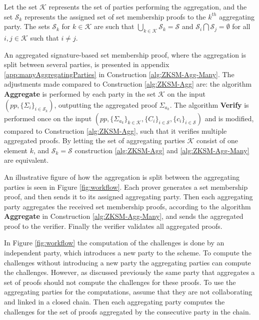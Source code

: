 Let the set $\mathcal{K}$ represents the set of parties performing the aggregation, and the set $\mathcal{S}_k$ represents the assigned set of set membership proofs to the $k^{th}$ aggregating party. The sets $\mathcal{S}_k$ for $k\in\mathcal{K}$ are such that $\bigcup_{k\in\mathcal{K}}\mathcal{S}_k = \mathcal{S}$ and $\mathcal{S}_i\bigcap \mathcal{S}_j= \emptyset$ for all $i,j\in\mathcal{K}$ such that $i\neq j$. 

An aggregated signature-based set membership proof, where the aggregation is split between several parties, is presented in appendix \ref{app:manyAggregatingParties} in Construction \ref{alg:ZKSM-Agg-Many}. The adjustments made compared to Construction \ref{alg:ZKSM-Agg} are: the algorithm \textbf{Aggregate} is performed by each party in the set $\mathcal{K}$ on the input $(pp,\{\Sigma_i\}_{i\in\mathcal{S}_k})$, outputting the aggregated proof $\Sigma_{a_k}$. The algorithm \textbf{Verify} is performed once on the input $(pp,\{\Sigma_{a_k}\}_{k\in\mathcal{K}},\{C_i\}_{i\in\mathcal{S}},\{c_i\}_{i\in\mathcal{S}} )$ and  is modified, compared to Construction \ref{alg:ZKSM-Agg}, such that it verifies multiple aggregated proofs. By letting the set of aggregating parties $\mathcal{K}$ consist of one element $k$, and $\mathcal{S}_k  = \mathcal{S}$ construction \ref{alg:ZKSM-Agg} and \ref{alg:ZKSM-Agg-Many} are equivalent. 


An illustrative figure of how the aggregation is split between the aggregating parties is seen in Figure \ref{fig:workflow}. Each prover generates a set membership proof, and then sends it to its assigned aggregating party. Then each aggregating party aggregates the received set membership proofs, according to the algorithm \textbf{Aggregate} in Construction \ref{alg:ZKSM-Agg-Many}, and sends the aggregated proof to the verifier. Finally the verifier validates all aggregated proofs.

In Figure \ref{fig:workflow} the computation of the challenges is done by an independent party, which introduces a new party to the scheme. To compute the challenges without introducing a new party the aggregating parties can compute the challenges.  However, as discussed previously the same party that aggregates a set of proofs should not compute the challenges for these proofs. To use the aggregating parties for the computations, assume that they are not collaborating and linked in a closed chain. Then each aggregating party computes the challenges for the set of proofs aggregated by the consecutive party in the chain.  


